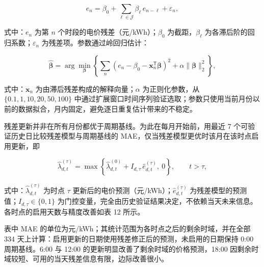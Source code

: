 \begin{equation}
  e_n = \beta_0 + \sum_{\ell\in\mathcal J}\beta_\ell\, e_{n-\ell} + \varepsilon_n,
  \label{eq:q4_ar}
\end{equation}

式中：$e_n$ 为第 $n$ 个时段的电价残差（元/kWh）；$\beta_0$ 为截距，$\beta_\ell$ 为各滞后阶的回归系数；$\varepsilon_n$ 为残差项。参数通过岭回归估计\cite{ref7}：

\begin{equation}
  \widehat{\boldsymbol\beta} = \arg\min_{\boldsymbol\beta}\left\{\sum_n \left(e_n-\beta_0-\mathbf x_n^{\mathsf T}\boldsymbol\beta\right)^2 + \alpha\|\boldsymbol\beta\|_2^2\right\},
  \label{eq:q4_ridge}
\end{equation}

式中：$\mathbf x_n$ 为由滞后残差构成的解释向量；$\alpha$ 为正则化参数，从 $\{0.1,1,10,20,50,100\}$ 中通过扩展窗口时间序列验证选取；参数只使用当前月份以前的数据拟合，月内固定，避免逐日重复估计带来的不稳定。

残差更新并非在所有月份都优于周期基线。为此在每月开始前，用最近 7 个可验证历史日比较残差模型与周期基线的 MAE，仅当残差模型更优时该月在该时点启用更新，即

\begin{equation}
  \widehat\lambda_{d,t}^{(\tau)} = \max\left\{\widehat\lambda_{d,t}^{(0)} + I_{d,\tau}\,\widehat e_{d,t}^{(\tau)},\ 0\right\}, \qquad t > \tau,
  \label{eq:q4_gated}
\end{equation}

式中：$\widehat\lambda_{d,t}^{(\tau)}$ 为时点 $\tau$ 更新后的电价预测（元/kWh）；$\widehat e_{d,t}^{(\tau)}$ 为残差模型的预测值；$I_{d,\tau}\in\{0,1\}$ 为门控变量，完全由历史验证结果决定，不依赖当天未来信息。各时点的启用天数与精度改善如表 12 所示。


表中 MAE 的单位为元/kWh；其统计范围为各时点之后的剩余时域，并在全部 334 天上计算：启用更新的日期使用残差修正后的预测，未启用的日期保持 0:00 周期基线。6:00 与 12:00 的更新明显改善了剩余时域的价格预测，18:00 因剩余时域较短、可用的当天残差信息有限，边际改善很小。

